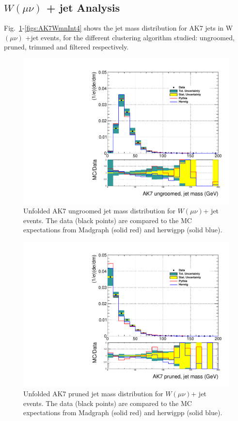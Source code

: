 \clearpage

\subsection{$W(\mu\nu)$ + jet Analysis}

Fig.~\ref{figs:AK7WmnInt1}-\ref{figs:AK7WmnInt4} shows the jet mass distribution for AK7 jets in W$(\mu\nu)$ +jet events, for the different clustering algorithm studied: ungroomed, pruned, trimmed and filtered respectively.

\begin{figure}[!htb]\centering\includegraphics[width=1.\textwidth]{figs/Wmn/jetmassunf_ak7_allpT.pdf}
\caption{Unfolded AK7 ungroomed jet mass distribution for $W(\mu\nu)$+ jet events. The data (black points) are compared to the MC expectations from Madgraph (solid red) and herwigpp (solid blue).}
\label{figs:AK7WmnInt1}
\end{figure}

\begin{figure}[!htb]\centering\includegraphics[width=1.\textwidth]{figs/Wmn/jetmassunf_ak7pr_allpT.pdf}
\caption{Unfolded AK7 pruned jet mass distribution for $W(\mu\nu)$+ jet events. The data (black points) are compared to the MC expectations from Madgraph (solid red) and herwigpp (solid blue).}
\label{figs:AK7WmnInt2}
\end{figure}

